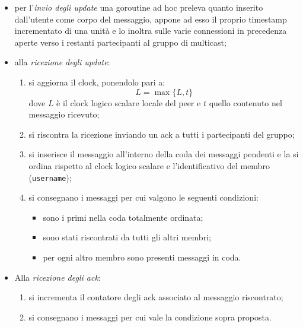 \documentclass[conference]{IEEEtran}
\begin{document}
\begin{itemize}
\item per l'\textsl{invio degli update} una goroutine ad hoc preleva quanto inserito dall'utente come corpo del messaggio, appone ad esso il proprio timestamp incrementato di una unità e lo inoltra sulle varie connessioni in precedenza aperte verso i restanti partecipanti al gruppo di multicast;

\item alla \textsl{ricezione degli update}:
\begin{enumerate}
\item si aggiorna il clock, ponendolo pari a:
\begin{equation}
L = \max\lbrace L, t \rbrace
\end{equation}
dove $L$ è il clock logico scalare locale del peer e $t$ quello contenuto nel messaggio ricevuto;
\item si riscontra la ricezione inviando un ack a tutti i partecipanti del gruppo;
\item si inserisce il messaggio all'interno della coda dei messaggi pendenti e la si ordina rispetto al clock logico scalare e l'identificativo del membro (\texttt{username});
\item si consegnano i messaggi per cui valgono le seguenti condizioni:
\begin{itemize}
\item sono i primi nella coda totalmente ordinata;
\item sono stati riscontrati da tutti gli altri membri;
\item per ogni altro membro sono presenti messaggi in coda.
\end{itemize}
\end{enumerate}

\item Alla \textsl{ricezione degli ack}:
\begin{enumerate}
\item si incrementa il contatore degli ack associato al messaggio riscontrato;
\item si consegnano i messaggi per cui vale la condizione sopra proposta.
\end{enumerate}
\end{itemize}
\end{document}
